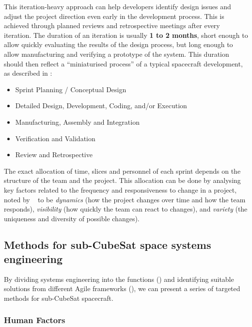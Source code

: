 \documentclass[journal,10pt]{IEEEtran}
\begin{document}
This iteration-heavy approach can help developers identify design issues and adjust the project direction even early in the development process. This is achieved through planned reviews and retrospective meetings after every iteration. The duration of an iteration is usually \textbf{1 to 2 months}, short enough to allow quickly evaluating the results of the design process, but long enough to allow manufacturing and verifying a prototype of the system. This duration should then reflect a ``miniaturised process'' of a typical spacecraft development, as described in \autocite{schwaverDefinitiveGuideScrum2020}:
\begin{itemize}
	\item Sprint Planning / Conceptual Design
	\item Detailed Design, Development, Coding, and/or Execution
	\item Manufacturing, Assembly and Integration
	\item Verification and Validation
	\item Review and Retrospective
\end{itemize}
The exact allocation of time, slices and personnel of each sprint depends on the structure of the team and the project.
This allocation can be done by analysing key factors related to the frequency and responsiveness to change in a project, noted by 
 \mbox{\citeauthor{honore-livermoreAgileSystemsEngineering2021} \autocite{honore-livermoreAgileSystemsEngineering2021}} to be \emph{dynamics} (how the project changes over time and how the team responds), \emph{visibility} (how quickly the team can react to changes), and \emph{variety} (the uniqueness and diversity of possible changes).%

 
\subsection{Methods for sub-CubeSat space systems engineering}
\label{sec:systems_engineering_aspects}

By dividing systems engineering into the functions () and identifying suitable solutions from different Agile frameworks (), we can present a series of targeted methods for sub-CubeSat spacecraft.

\subsubsection{Human Factors}
\label{sec:humans}
\end{document}
